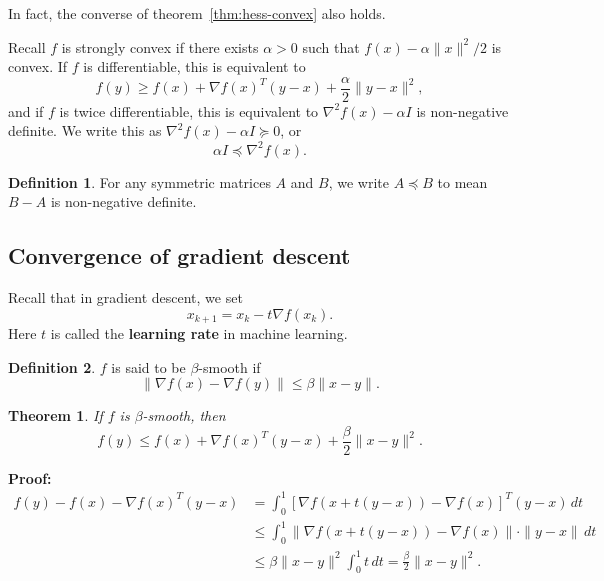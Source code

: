 \documentclass[12pt]{article}
\newtheorem{theorem}{Theorem}[section]
\theoremstyle{definition}
\newtheorem{definition}{Definition}[section]
\theoremstyle{remark}
\begin{document}
In fact, the converse of theorem~\ref{thm:hess-convex} also holds.

Recall $f$ is strongly convex if there exists $\alpha > 0$ such that $f(x) - \alpha \|x\|^2/2$ is convex. If $f$ is differentiable, this is equivalent to
\[
	f(y) \geq f(x) + \nabla f(x)^{T} (y - x) + \frac{\alpha}{2} \|y - x\|^2
,\]
and if $f$ is twice differentiable, this is equivalent to $\nabla^2f(x) - \alpha I$ is non-negative definite. We write this as $\nabla^2 f(x) - \alpha I \succeq 0$, or
\[
	\alpha I \preceq \nabla^2 f(x)
.\]

\begin{definition}
	For any symmetric matrices $A$ and $B$, we write $A \preceq B$ to mean $B - A$ is non-negative definite.
\end{definition}

\subsection{Convergence of gradient descent}%
\label{sub:convergence_of_gradient_descent}

Recall that in gradient descent, we set
\[
	x_{k + 1} = x_k - t \nabla f(x_k)
.\]
Here $t$ is called the \textbf{learning rate} in machine learning.

\begin{definition}
	$f$ is said to be $\beta$-smooth if
	\[
		\| \nabla f(x) - \nabla f(y) \| \leq \beta \|x - y \|
	.\]
\end{definition}

\begin{theorem}
\label{thm:b-smooth}
	If $f$ is $\beta$-smooth, then
	\[
		f(y) \leq f(x) + \nabla f(x)^{T}(y - x) + \frac{\beta}{2} \|x - y\|^2
	.\]
\end{theorem}

\begin{adjustbox}{minipage = \columnwidth - 25.5pt, margin=1em, frame=1pt, margin=0em}
\textbf{Proof:}
\begin{align*}
	f(y) - f(x) - \nabla f(x)^{T}(y - x) &= \int_{0}^{1} [\nabla f(x + t(y - x)) - \nabla f(x) ]^{T} (y - x) \, dt \\
					     &\leq \int_{0}^{1} \| \nabla f(x + t(y - x)) - \nabla f(x) \| \cdot \|y - x \| \, dt \\
					     &\leq \beta \|x - y\|^2 \int_{0}^{1} t \, dt = \frac{\beta}{2} \|x - y\|^2.
\end{align*}

\end{adjustbox}
\end{document}
